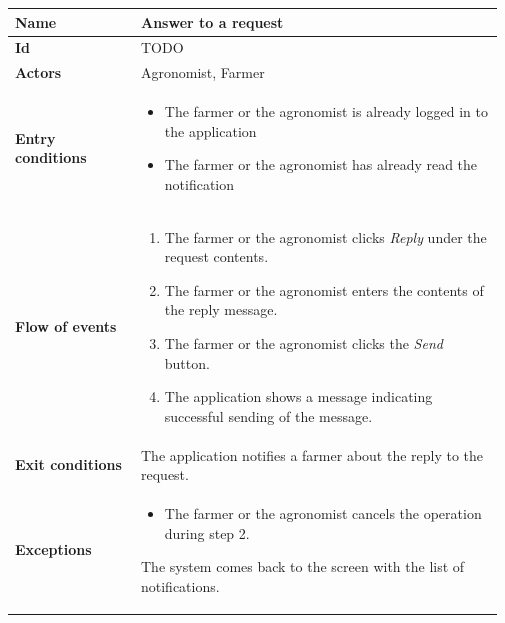 \begin{center}
	\begin{tabular}{@{}p{0.25\linewidth} p{0.72\linewidth}@{}}
		\toprule
		\textbf{Name}               & Answer to a request\\
		\midrule
		\textbf{Id}                 & TODO\\
		\midrule
		\textbf{Actors}             & Agronomist, Farmer\\
		\midrule
		
		\textbf{Entry conditions}   & \begin{itemize}[leftmargin=.4cm,noitemsep,topsep=0pt,before=\vspace{-3mm},after=\vspace{-4mm}]
		    \item The farmer or the agronomist is already logged in to the application
		    \item The farmer or the agronomist has already read the notification
		\end{itemize}\\
		\midrule
		
		\textbf{Flow of events}     & \begin{enumerate}[leftmargin=.4cm,noitemsep,topsep=0pt,before=\vspace{-3mm},after=\vspace{-4mm}]
		    \item The farmer or the agronomist clicks \textit{Reply} under the request contents.
		    \item The farmer or the agronomist enters the contents of the reply message.
		    \item The farmer or the agronomist clicks the \textit{Send} button.
		    \item The application shows a message indicating successful sending of the message.
		\end{enumerate}\\
		\midrule
		\textbf{Exit conditions}    & The application notifies a farmer about the reply to the request. \\
		\midrule
		
		\textbf{Exceptions}         & \begin{itemize}[leftmargin=.4cm,noitemsep,topsep=0pt,before=\vspace{-3mm}]
		   \item The farmer or the agronomist cancels the operation during step 2.
		\end{itemize}
	    The system comes back to the screen with the list of notifications.\\
		\bottomrule
	\end{tabular}
\end{center}


